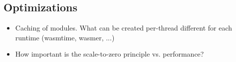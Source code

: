 
\subsection{Optimizations}

\begin{itemize}
    \item Caching of modules. What can be created per-thread different for each runtime (wasmtime, wasmer, ...)
    \item How important is the scale-to-zero principle vs. performance?
\end{itemize}